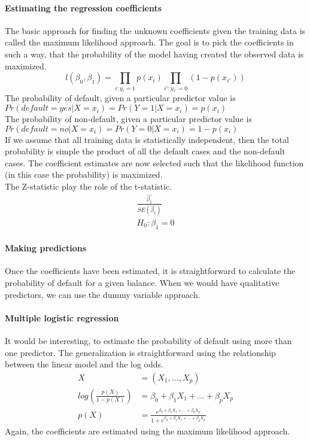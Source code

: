 \documentclass[../document.tex]{subfiles}
\begin{document}
	\paragraph{Estimating the regression coefficients}
	The basic approach for finding the unknown coefficients given the training data is called the maximum likelihood approach. The goal is to pick the coefficients in such a way, that the probability of the model having created the observed data is maximized.
	\begin{equation}
		l(\beta_{0},\beta_{1})=\prod_{i:y_{i}=1}p(x_{i})\prod_{i':y_{i'}=0}(1-p(x_{i'}))
	\end{equation}
	The probability of default, given a particular predictor value is \(Pr(default=yes|X=x_{i})=Pr(Y=1|X=x_{i})=p(x_{i})\)\\
	The probability of non-default, given a particular predictor value is \(Pr(default=no|X=x_{i})=Pr(Y=0|X=x_{i})=1-p(x_{i})\)\\
	If we assume that all training data is statistically independent, then the total probability is simple the product of all the default cases and the non-default cases. The coefficient estimates are now selected such that the likelihood function (in this case the probability) is maximized.\\
	The Z-statistic play the role of the t-statistic.
	\begin{equation}
	\begin{split}
		\frac{\hat{\beta_{1}}}{SE(\hat{\beta_{1}})}\\
		H_{0}:\beta_{1}=0
	\end{split}
	\end{equation}

	\paragraph{Making predictions}
	Once the coefficients have been estimated, it is straightforward to calculate the probability of default for a given balance. When we would have qualitative predictors, we can use the dummy variable approach.

	\paragraph{Multiple logistic regression}
	It would be interesting, to estimate the probability of default using more than one predictor. The generalization is straightforward using the relationship between the linear model and the log odds.
	\begin{equation}
	\begin{split}
		X &= (X_{1},...,X_{p})\\
		log(\frac{p(X)}{1-p(X)})&=\beta_{0}+\beta_{1}X_{1}+...+\beta_{p}X_{p}\\
		p(X)&=\frac{e^{\beta_{0}+\beta_{1}X_{1}+...+\beta_{p}X_{p}}}{1+e^{\beta_{0}+\beta_{1}X_{1}+...+\beta_{p}X_{p}}}
	\end{split}
	\end{equation}
	Again, the coefficients are estimated using the maximum likelihood approach.
\end{document}
